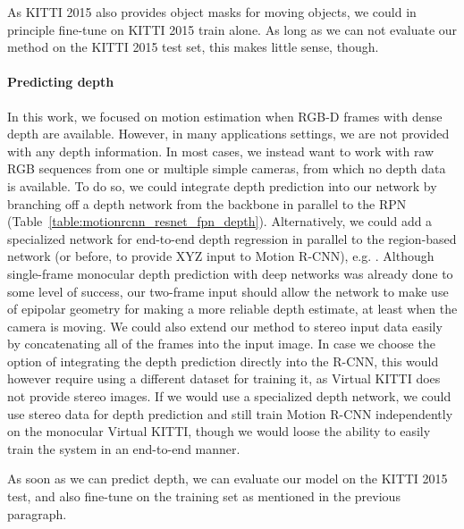 As KITTI 2015 also provides object masks for moving objects, we could in principle
fine-tune on KITTI 2015 train alone. As long as we can not evaluate our method on the
KITTI 2015 test set, this makes little sense, though.

\paragraph{Predicting depth}
In this work, we focused on motion estimation when RGB-D frames with dense depth are available.
However, in many applications settings, we are not provided with any depth information.
In most cases, we instead want to work with raw RGB sequences from one or multiple simple cameras,
from which no depth data is available.
To do so, we could integrate depth prediction into our network by branching off a
depth network from the backbone in parallel to the RPN (Table~\ref{table:motionrcnn_resnet_fpn_depth}).
Alternatively, we could add a specialized network for end-to-end depth regression
in parallel to the region-based network (or before, to provide XYZ input to Motion R-CNN), e.g. \cite{GCNet}.
Although single-frame monocular depth prediction with deep networks was already done
to some level of success,
our two-frame input should allow the network to make use of epipolar
geometry for making a more reliable depth estimate, at least when the camera
is moving. We could also extend our method to stereo input data easily by concatenating
all of the frames into the input image.
In case we choose the option of integrating the depth prediction directly into
the R-CNN,
this would however require using a different dataset for training it, as Virtual KITTI does not
provide stereo images.
If we would use a specialized depth network, we could use stereo data
for depth prediction and still train Motion R-CNN independently on the monocular Virtual KITTI,
though we would loose the ability to easily train the system in an end-to-end manner.

As soon as we can predict depth, we can evaluate our model on the KITTI 2015 test,
and also fine-tune on the training set as mentioned in the previous paragraph.

